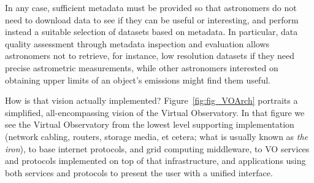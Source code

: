 	 In any case, sufficient metadata must be provided so that
	astronomers do not need to download data to see if they can be
	useful or interesting, and perform instead a suitable selection
	of datasets based on metadata. In particular, data quality
	assessment through metadata inspection and evaluation allows
	astronomers not to retrieve, for instance, low resolution
	datasets if they need precise astrometric measurements, while
	other astronomers interested on obtaining upper limits of an
	object's emissions might find them useful.


	How is that vision actually implemented?
	Figure~\ref{fig:fig_VOArch} portraits a simplified,
	all-encompassing vision of the Virtual Observatory. In that
	figure we see the Virtual Observatory from the lowest level
	supporting implementation (network cabling, routers, storage
	media, et cetera; what is usually known as \emph{the iron}), to
	base internet protocols, and grid computing middleware, to VO
	services and protocols implemented on top of that
	infrastructure, and applications using both services and
	protocols to present the user with a unified interface.

